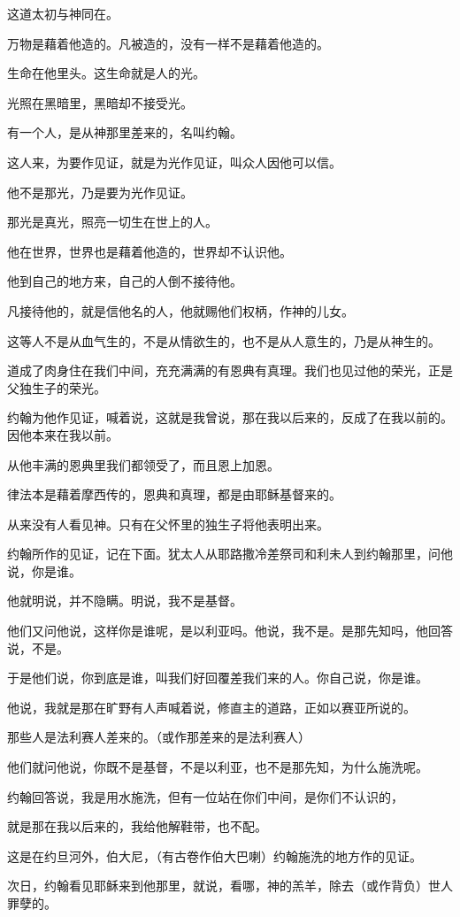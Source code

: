 \documentclass[12pt,oneside]{book}
\begin{document}
这道太初与神同在。

万物是藉着他造的。凡被造的，没有一样不是藉着他造的。

生命在他里头。这生命就是人的光。

光照在黑暗里，黑暗却不接受光。

有一个人，是从神那里差来的，名叫约翰。

这人来，为要作见证，就是为光作见证，叫众人因他可以信。

他不是那光，乃是要为光作见证。

那光是真光，照亮一切生在世上的人。

他在世界，世界也是藉着他造的，世界却不认识他。

他到自己的地方来，自己的人倒不接待他。

凡接待他的，就是信他名的人，他就赐他们权柄，作神的儿女。

这等人不是从血气生的，不是从情欲生的，也不是从人意生的，乃是从神生的。

道成了肉身住在我们中间，充充满满的有恩典有真理。我们也见过他的荣光，正是父独生子的荣光。

约翰为他作见证，喊着说，这就是我曾说，那在我以后来的，反成了在我以前的。因他本来在我以前。

从他丰满的恩典里我们都领受了，而且恩上加恩。

律法本是藉着摩西传的，恩典和真理，都是由耶稣基督来的。

从来没有人看见神。只有在父怀里的独生子将他表明出来。

约翰所作的见证，记在下面。犹太人从耶路撒冷差祭司和利未人到约翰那里，问他说，你是谁。

他就明说，并不隐瞒。明说，我不是基督。

他们又问他说，这样你是谁呢，是以利亚吗。他说，我不是。是那先知吗，他回答说，不是。

于是他们说，你到底是谁，叫我们好回覆差我们来的人。你自己说，你是谁。

他说，我就是那在旷野有人声喊着说，修直主的道路，正如以赛亚所说的。

那些人是法利赛人差来的。（或作那差来的是法利赛人）

他们就问他说，你既不是基督，不是以利亚，也不是那先知，为什么施洗呢。

约翰回答说，我是用水施洗，但有一位站在你们中间，是你们不认识的，

就是那在我以后来的，我给他解鞋带，也不配。

这是在约旦河外，伯大尼，（有古卷作伯大巴喇）约翰施洗的地方作的见证。

次日，约翰看见耶稣来到他那里，就说，看哪，神的羔羊，除去（或作背负）世人罪孽的。
\end{document}
